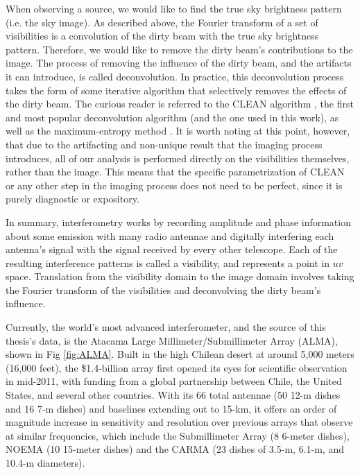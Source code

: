 When observing a source, we would like to find the true sky brightness pattern (i.e. the sky image). As described above, the Fourier transform of a set of visibilities is a convolution of the dirty beam with the true sky brightness pattern. Therefore, we would like to remove the dirty beam's contributions to the image. The process of removing the influence of the dirty beam, and the artifacts it can introduce, is called deconvolution. In practice, this deconvolution process takes the form of some iterative algorithm that selectively removes the effects of the dirty beam. The curious reader is referred to the CLEAN algorithm \citep{Hogbom1974}, the first and most popular deconvolution algorithm (and the one used in this work), as well as the maximum-entropy method \citep{Wernecke1977,SkillingBryan1984}. It is worth noting at this point, however, that due to the artifacting and non-unique result that the imaging process introduces, all of our analysis is performed directly on the visibilities themselves, rather than the image. This means that the specific parametrization of CLEAN or any other step in the imaging process does not need to be perfect, since it is purely diagnostic or expository.


In summary, interferometry works by recording amplitude and phase information about some emission with many radio antennae and digitally interfering each antenna's signal with the signal received by every other telescope. Each of the resulting interference patterns is called a visibility, and represents a point in $uv$ space. Translation from the visibility domain to the image domain involves taking the Fourier transform of the visibilities and deconvolving the dirty beam's influence.

Currently, the world's most advanced interferometer, and the source of this thesis's data, is the Atacama Large Millimeter/Submillimeter Array (ALMA), shown in Fig \ref{fig:ALMA}. Built in the high Chilean desert at around 5,000 meters (16,000 feet), the \$1.4-billion array first opened its eyes for scientific observation in mid-2011, with funding from a global partnership between Chile, the United States, and several other countries. With its 66 total antennae (50 12-m dishes and 16 7-m dishes) and baselines extending out to 15-km, it offers an order of magnitude increase in sensitivity and resolution over previous arrays that observe at similar frequencies, which include the Submillimeter Array (8 6-meter dishes), NOEMA (10 15-meter dishes) and the CARMA (23 dishes of 3.5-m, 6.1-m, and 10.4-m diameters).

